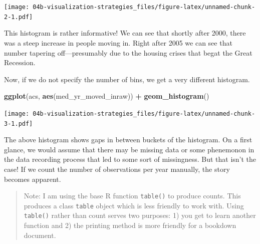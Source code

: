 \documentclass[
]{book}
\newenvironment{Shaded}{\begin{snugshade}}{\end{snugshade}}
\newcommand{\CommentTok}[1]{\textcolor[rgb]{0.56,0.35,0.01}{\textit{#1}}}
\newcommand{\KeywordTok}[1]{\textcolor[rgb]{0.13,0.29,0.53}{\textbf{#1}}}
\newcommand{\NormalTok}[1]{#1}
\newcommand{\OperatorTok}[1]{\textcolor[rgb]{0.81,0.36,0.00}{\textbf{#1}}}
\newcommand{\StringTok}[1]{\textcolor[rgb]{0.31,0.60,0.02}{#1}}
\begin{document}
\texttt{[image: 04b-visualization-strategies\_files/figure-latex/unnamed-chunk-2-1.pdf]}

This histogram is rather informative! We can see that shortly after 2000, there was a steep increase in people moving in. Right after 2005 we can see that number tapering off---presumably due to the housing crises that begat the Great Recession.

Now, if we do not specify the number of bins, we get a very different histogram.

\begin{Shaded}
\begin{Highlighting}[]
\KeywordTok{ggplot}\NormalTok{(acs, }\KeywordTok{aes}\NormalTok{(med\_yr\_moved\_inraw)) }\OperatorTok{+}
\StringTok{  }\KeywordTok{geom\_histogram}\NormalTok{()}
\end{Highlighting}
\end{Shaded}

\texttt{[image: 04b-visualization-strategies\_files/figure-latex/unnamed-chunk-3-1.pdf]}

The above histogram shows gaps in between buckets of the histogram. On a first glance, we would assume that there may be missing data or some phenemonon in the data recording process that led to some sort of missingness. But that isn't the case! If we count the number of observations per year manually, the story becomes apparent.

\begin{quote}
Note: I am using the base R function \texttt{table()} to produce counts. This produces a class \texttt{table} object which is less friendly to work with. Using \texttt{table()} rather than count serves two purposes: 1) you get to learn another function and 2) the printing method is more friendly for a bookdown document.
\end{quote}

\begin{Shaded}
\end{Shaded}
\end{document}
